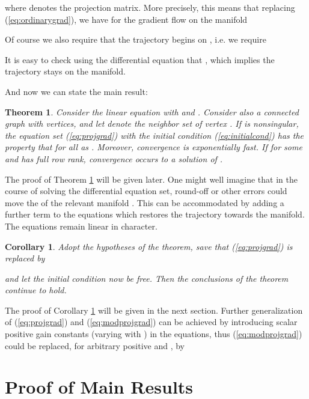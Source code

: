 \documentclass{aims}
\newtheorem{thm}{\textbf{Theorem}}
\newtheorem{cor}{\textbf{Corollary}}
\begin{document}
where  denotes the projection matrix.
More precisely, this means that replacing (\ref{eq:ordinarygrad}), we have for the gradient flow on the manifold 

Of course we also require that the trajectory begins on , i.e. we require

It is easy to check using the differential equation that , which implies the trajectory stays on the manifold.

And now we can state the main result:
\begin{thm}\label{Thm_main}
Consider the linear equation  with  and
. Consider also a connected graph  with  vertices, and let 
denote the neighbor set of vertex . If  is nonsingular, the
equation set (\ref{eq:projgrad}) with the initial condition (\ref{eq:initialcond}) has the property that  for all  as . Moreover, convergence is exponentially fast.  If  for some  and has full row rank, convergence occurs to a solution of .
\end{thm}

The proof of Theorem \ref{Thm_main} will be given later. One might well imagine that in the course of solving the differential equation set, round-off or other errors could move the  of the relevant manifold . This can be accommodated by adding a further term to the equations which restores the trajectory towards the manifold. The equations remain linear in character.

\begin{cor}\label{Cor_1}
Adopt the hypotheses of the theorem, save that (\ref{eq:projgrad}) is replaced by

and let the initial condition now be free. Then the conclusions of the theorem continue to hold.
\end{cor}

The proof of Corollary \ref{Cor_1} will be given in the next section. Further generalization of (\ref{eq:projgrad}) and (\ref{eq:modprojgrad}) can be achieved by introducing scalar positive gain constants (varying with ) in the equations, thus (\ref{eq:modprojgrad}) could be replaced, for arbitrary positive  and , by






\section{Proof of Main Results}
\end{document}
